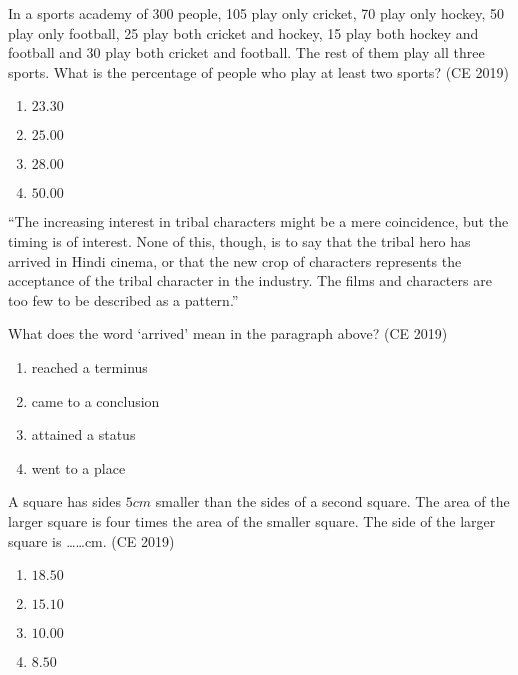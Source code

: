     \item In a sports academy of 300 people, 105 play only cricket, 70 play only hockey, 50 play only football, 25 play both cricket and hockey, 15 play both hockey and football and 30 play both cricket and football. The rest of them play all three sports. What is the percentage of people who play at least two sports?  \hfill (CE 2019)

    \begin{multicols}{4}
        \begin{enumerate}
            \item $23.30$
            \item $25.00$
            \item $28.00$
            \item $50.00$
        \end{enumerate}
    \end{multicols}

    \item ``The increasing interest in tribal characters might be a mere coincidence, but the timing is of interest. None of this, though, is to say that the tribal hero has arrived in Hindi cinema, or that the new crop of characters represents the acceptance of the tribal character in the industry. The films and characters are too few to be described as a pattern.''

    What does the word `arrived' mean in the paragraph above?  \hfill (CE 2019)

    \begin{multicols}{2}
        \begin{enumerate}
            \item reached a terminus
            \item came to a conclusion
            \item attained a status
            \item went to a place
        \end{enumerate}
    \end{multicols}

    \item A square has sides $5 cm$ smaller than the sides of a second square. The area of the larger square is four times the area of the smaller square. The side of the larger square is \ldots\ldots cm.  \hfill (CE 2019)

    \begin{multicols}{4}
        \begin{enumerate}
            \item $18.50$
            \item $15.10$
            \item $10.00$
            \item $8.50$
        \end{enumerate}
    \end{multicols}

